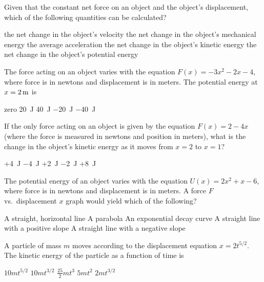 \documentclass{../../../oss-apphys-exam}
\begin{document}
\begin{multicols*}{2}
\begin{questions}
    \question Given that the constant net force on an object and the object's 
    displacement, which of the following quantities can be calculated?
    \begin{choices}
      \choice the net change in the object's velocity
      \choice the net change in the object's mechanical energy
      \choice the average acceleration
      \choice the net change in the object's kinetic energy
      \choice the net change in the object's potential energy
    \end{choices}
    
    \question The force acting on an object varies with the equation
    $F(x)=-3x^2-2x-4$, where force is in newtons and displacement is in meters.
    The potential energy at $x=\SI2{\metre}$ is
    \begin{choices}
      \choice zero
      \choice\SI{20}{\joule}
      \choice\SI{40}{\joule}
      \choice\SI{-20}{\joule}
      \choice\SI{-40}{\joule}
    \end{choices}
    
    \question If the only force acting on an object is given by the equation
    $F(x)=2-4x$ (where the force is measured in newtons and position in meters),
    what is the change in the object's kinetic energy as it moves from $x=2$ to
    $x=1$?
    \begin{choices}
      \choice +\SI{4}{\joule}
      \choice \SI{-4}{\joule}
      \choice +\SI{2}{\joule}
      \choice \SI{-2}{\joule}
      \choice +\SI{8}{\joule}
    \end{choices}
    \columnbreak
    
    \question The potential energy of an object varies with the equation
    $U(x)=2x^2+x-6$, where force is in newtons and displacement is in meters. A
    force $F$ vs.\ displacement $x$ graph would yield which of the following?
    \begin{choices}
      \choice A straight, horizontal line
      \choice A parabola
      \choice An exponential decay curve
      \choice A straight line with a positive slope
      \choice A straight line with a negative slope
    \end{choices}
    
    \question A particle of mass $m$ moves according to the displacement
    equation $x=2t^{5/2}$. The kinetic energy of the particle as a function of
    time is
    \begin{choices}
      \choice $10mt^{5/2}$
      \choice $10mt^{3/2}$
      \choice $\displaystyle\frac{25}2mt^3$
      \choice $5mt^2$
      \choice $2mt^{3/2}$
    \end{choices}


\end{questions}
\end{multicols*}
\end{document}
